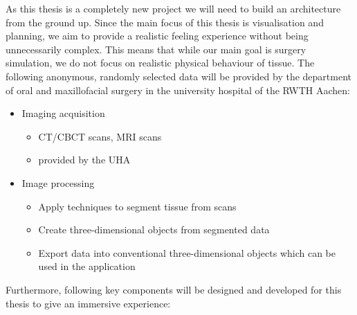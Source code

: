 As this thesis is a completely new project we will need to build an architecture from the ground up.
Since the main focus of this thesis is visualisation and planning, we aim to provide a realistic feeling experience without being unnecessarily complex.
This means that while our main goal is surgery simulation, we do not focus on realistic physical behaviour of tissue.
The following anonymous, randomly selected data will be provided by the department of oral and maxillofacial surgery in the university hospital of the RWTH Aachen:
\begin{itemize}
    \item Imaging acquisition
    \begin{itemize}
        \item CT/CBCT scans, MRI scans
        \item provided by the UHA
    \end{itemize}
\item Image processing
    \begin{itemize}
        \item Apply techniques to segment tissue from scans
        \item Create three-dimensional objects from segmented data
        \item Export data into conventional three-dimensional objects which can be used in the application
    \end{itemize}
\end{itemize}

Furthermore, following key components will be designed and developed for this thesis to give an immersive experience:

